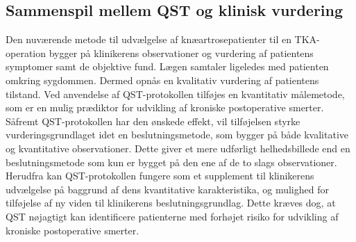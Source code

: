 \subsection{Sammenspil mellem QST og klinisk vurdering} 
Den nuværende metode til udvælgelse af knæartrosepatienter til en TKA-operation bygger på klinikerens observationer og vurdering af patientens symptomer samt de objektive fund. Lægen samtaler ligeledes med patienten omkring sygdommen. Dermed opnås en kvalitativ vurdering af patientens tilstand. \citep{Troelsen2012} \citep{skou2016} Ved anvendelse af QST-protokollen tilføjes en kvantitativ målemetode, som er en mulig prædiktor for udvikling af kroniske postoperative smerter. Såfremt QST-protokollen har den ønskede effekt, vil tilføjelsen styrke vurderingsgrundlaget idet en beslutningsmetode, som bygger på både kvalitative og kvantitative observationer. Dette giver et mere udførligt helhedsbillede end en beslutningsmetode som kun er bygget på den ene af de to slags observationer. \citep{Gronmo2012} \\
Herudfra kan QST-protokollen fungere som et supplement til klinikerens udvælgelse på baggrund af dens kvantitative karakteristika, og mulighed for tilføjelse af ny viden til klinikerens beslutningsgrundlag. Dette kræves dog, at QST nøjagtigt kan identificere patienterne med forhøjet risiko for udvikling af kroniske postoperative smerter.   

